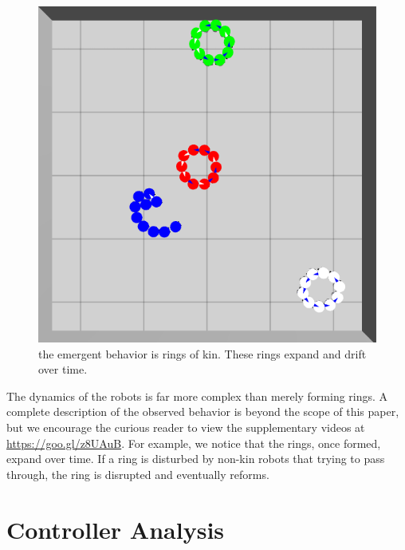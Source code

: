 \documentclass[conference]{IEEEtran}
\begin{document}
    \begin{figure}
      \centering
      \includegraphics[width=0.7\linewidth]{./images/rings_example.png}
      \caption{the emergent behavior is rings of kin. These rings expand and drift over time.}
      \label{fig:rings}
    \end{figure}

    The dynamics of the robots is far more complex than merely forming rings. A complete description of the observed behavior is beyond the scope of this paper, but we encourage the curious reader to view the supplementary videos at \href{https://www.youtube.com/playlist?list=PL9HqYJ1IkIKVX9EsT5BY9LnBsBPTjc5bB}{https://goo.gl/z8UAuB}. For example, we notice that the rings, once formed, expand over time. If a ring is disturbed by non-kin robots that trying to pass through, the ring is disrupted and eventually reforms.

\section{Controller Analysis}
\end{document}
